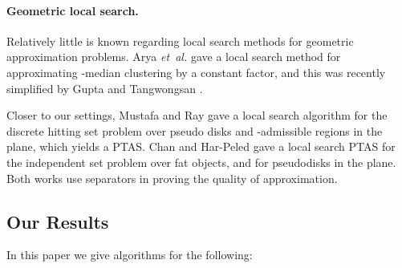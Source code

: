 \InSubmitVer{\documentclass[11pt]{article}}
\numberwithin{figure}{section}
\numberwithin{table}{section}
\numberwithin{equation}{section}
\newcommand{\Term}[1]{\textsf{#1}}
\newcommand{\PTAS}{\Term{PTAS}\xspace}
\newcommand{\etal}{\textit{et~al.}\xspace}
\begin{document}
\paragraph{Geometric local search.}

Relatively little is known regarding local search methods for
geometric approximation problems. Arya \etal \cite{agkmp-lshkm-01}
gave a local search method for approximating -median clustering by
a constant factor, and this was recently simplified by Gupta and
Tangwongsan \cite{gt-salsa-08}.

Closer to our settings, Mustafa and Ray \cite{mr-pghsp-09} gave a
local search algorithm for the discrete hitting set problem over
pseudo disks and -admissible regions in the plane, which yields a 
\PTAS.  Chan and Har-Peled \cite{ch-aamis-12} gave a local search \PTAS 
for the independent set problem over fat objects, and for pseudodisks 
in the plane. Both works use separators in proving the quality of 
approximation. 









\subsection{Our Results}

In this paper we give algorithms for the following:

\smallskip
\end{document}
